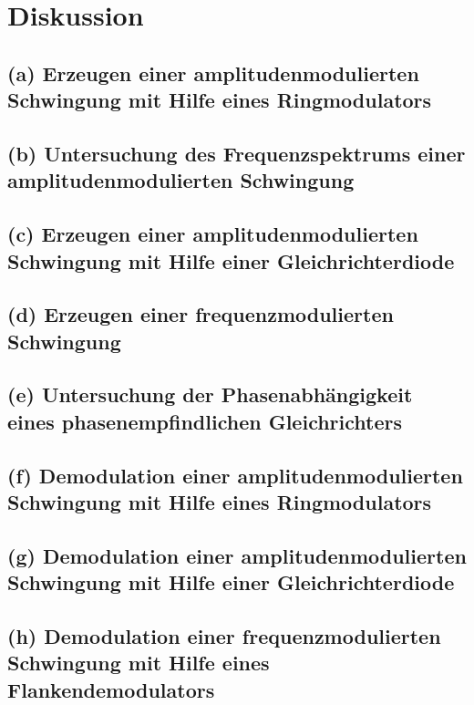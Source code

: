 \FloatBarrier
\section{Diskussion}
\label{sec:Diskussion}


\subsection{(a) Erzeugen einer amplitudenmodulierten Schwingung mit
Hilfe eines Ringmodulators}


\subsection{(b) Untersuchung des Frequenzspektrums einer
amplitudenmodulierten Schwingung}


\subsection{(c) Erzeugen einer amplitudenmodulierten Schwingung
mit Hilfe einer Gleichrichterdiode}


\subsection{(d) Erzeugen einer frequenzmodulierten Schwingung}


\subsection{(e) Untersuchung der Phasenabhängigkeit eines
phasenempfindlichen Gleichrichters}


\subsection{(f) Demodulation einer amplitudenmodulierten Schwingung
mit Hilfe eines Ringmodulators}


\subsection{(g) Demodulation einer amplitudenmodulierten Schwingung
mit Hilfe einer Gleichrichterdiode}


\subsection{(h) Demodulation einer frequenzmodulierten Schwingung
mit Hilfe eines Flankendemodulators}
